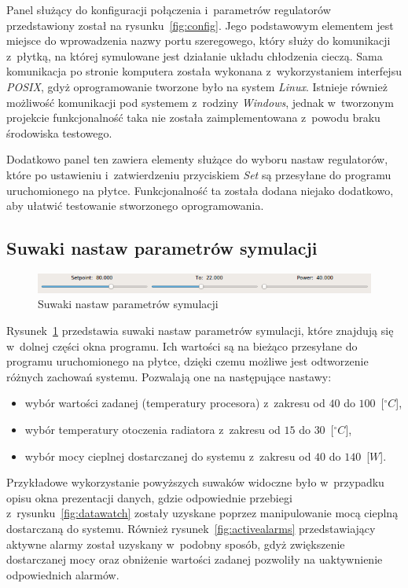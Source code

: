Panel służący do konfiguracji połączenia i~parametrów regulatorów przedstawiony
został na rysunku~\ref{fig:config}. Jego podstawowym elementem jest miejsce do
wprowadzenia nazwy portu szeregowego, który służy do komunikacji z~płytką, na
której symulowane jest działanie układu chłodzenia cieczą. Sama komunikacja po
stronie komputera została wykonana z~wykorzystaniem interfejsu \textit{POSIX},
gdyż oprogramowanie tworzone było na system \textit{Linux}. Istnieje również
możliwość komunikacji pod systemem z~rodziny \textit{Windows}, jednak
w~tworzonym projekcie funkcjonalność taka nie została zaimplementowana z~powodu
braku środowiska testowego.

Dodatkowo panel ten zawiera elementy służące do wyboru nastaw regulatorów, które
po ustawieniu i~zatwierdzeniu przyciskiem \textit{Set} są przesyłane do programu
uruchomionego na płytce. Funkcjonalność ta została dodana niejako dodatkowo, aby
ułatwić testowanie stworzonego oprogramowania.

\newpage
\subsection{Suwaki nastaw parametrów symulacji}
\indent

\begin{figure}[!ht]
    \centering
    \includegraphics[width=\textwidth]{../img/sliders.png}
    \caption{Suwaki nastaw parametrów symulacji}
    \label{fig:sliders}
\end{figure}

Rysunek~\ref{fig:sliders} przedstawia suwaki nastaw parametrów symulacji, które
znajdują się w~dolnej części okna programu. Ich wartości są na bieżąco
przesyłane do programu uruchomionego na płytce, dzięki czemu możliwe jest
odtworzenie różnych zachowań systemu. Pozwalają one na następujące nastawy:
\begin{itemize}
    \item wybór wartości zadanej (temperatury procesora) z~zakresu od $40$ do
    $100$~[$^\circ C$],
    \item wybór temperatury otoczenia radiatora z~zakresu od $15$ do
    $30$~[$^\circ C$],
    \item wybór mocy cieplnej dostarczanej do systemu z~zakresu od $40$ do
    $140$~[$W$].
\end{itemize}

Przykładowe wykorzystanie powyższych suwaków widoczne było w~przypadku opisu
okna prezentacji danych, gdzie odpowiednie przebiegi
z~rysunku~\ref{fig:datawatch} zostały uzyskane poprzez manipulowanie mocą
cieplną dostarczaną do systemu. Również rysunek~\ref{fig:activealarms}
przedstawiający aktywne alarmy został uzyskany w~podobny sposób, gdyż
zwiększenie dostarczanej mocy oraz obniżenie wartości zadanej pozwoliły na
uaktywnienie odpowiednich alarmów.
